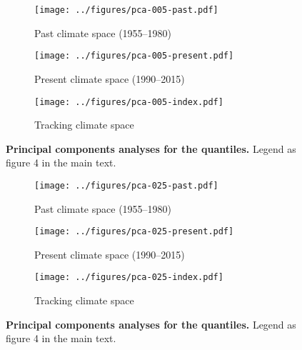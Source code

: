 \documentclass[12pt]{report}
\begin{document}
\begin{figure}[h!]
  \begin{center}
    \begin{subfigure}{.45\textwidth}
      \texttt{[image: ../figures/pca-005-past.pdf]}
      \caption{Past climate space (1955--1980)}
    \end{subfigure}
    \begin{subfigure}{.45\textwidth}
      \texttt{[image: ../figures/pca-005-present.pdf]}
      \caption{Present climate space (1990--2015)}
    \end{subfigure}
    \begin{subfigure}{.45\textwidth}
      \texttt{[image: ../figures/pca-005-index.pdf]}
      \caption{Tracking climate space}
    \end{subfigure}
  \end{center}
  \caption{\doublespacing \textbf{Principal components analyses for
      the  quantiles.} Legend as figure 4 in the main text.}
  \label{pca}
\end{figure}
\begin{figure}[h!]
  \begin{center}
    \begin{subfigure}{.45\textwidth}
      \texttt{[image: ../figures/pca-025-past.pdf]}
      \caption{Past climate space (1955--1980)}
    \end{subfigure}
    \begin{subfigure}{.45\textwidth}
      \texttt{[image: ../figures/pca-025-present.pdf]}
      \caption{Present climate space (1990--2015)}
    \end{subfigure}
    \begin{subfigure}{.45\textwidth}
      \texttt{[image: ../figures/pca-025-index.pdf]}
      \caption{Tracking climate space}
    \end{subfigure}
  \end{center}
  \caption{\doublespacing \textbf{Principal components analyses for
      the  quantiles.} Legend as figure 4 in the main text.}
  \label{pca}
\end{figure}
\end{document}
